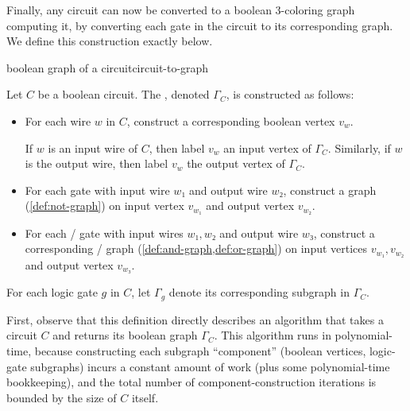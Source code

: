 %
%
%  
%  

Finally, any circuit can now be converted to a boolean 3-coloring graph
computing it, by converting each gate in the circuit to its corresponding graph.
We define this construction exactly below.

\begin{definition}{boolean graph of a circuit}{circuit-to-graph}

  Let \(C\) be a boolean circuit.  The , denoted
  \(Γ_C\), is constructed as follows:
  \begin{itemize}
    \item For each wire \(w\) in \(C\), construct a corresponding boolean vertex
      \(v_w\).

      If \(w\) is an input wire of \(C\), then label \(v_w\) an input vertex of
      \(Γ_C\).  Similarly, if \(w\) is the output wire, then label \(v_w\) the
      output vertex of \(Γ_C\).
    \item For each \NOT{} gate with input wire \(w₁\) and output wire \(w₂\),
      construct a \NOT{} graph (\cref{def:not-graph}) on input vertex \(v_{w₁}\)
      and output vertex \(v_{w₂}\).
    \item For each \AND/\OR{} gate with input wires \(w₁,w₂\) and output wire
      \(w₃\), construct a corresponding \AND/\OR{} graph
      (\cref{def:and-graph,def:or-graph}) on input vertices \(v_{w₁},v_{w₂}\)
      and output vertex \(v_{w₃}\).
  \end{itemize}
  For each logic gate \(g\) in \(C\), let \(Γ_g\) denote its corresponding
  subgraph in \(Γ_C\).

\end{definition}

First, observe that this definition directly describes an algorithm that takes a
circuit \(C\) and returns its boolean graph \(Γ_C\).  This algorithm runs in
polynomial-time, because constructing each subgraph ``component'' (boolean
vertices, logic-gate subgraphs) incurs a constant amount of work (plus some
polynomial-time bookkeeping), and the total number of component-construction
iterations is bounded by the size of \(C\) itself.

